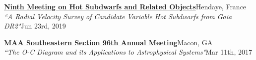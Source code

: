 \documentclass[letterpaper,12pt]{article}
\begin{document}
\vspace{3mm}
\noindent{}

\begin{etaremune}
    \item \href{https://sdob9.sciencesconf.org/}{{\small\textbf{Ninth Meeting on Hot Subdwarfs and Related Objects}}}\hfill{\small Hendaye, France}\\
    {\footnotesize \textit{``A Radial Velocity Survey of Candidate Variable Hot Subdwarfs from Gaia DR2"}\hfill \footnotesize Jun 23rd, 2019}
    \item \href{http://sections.maa.org/southeastern/2017Conference/}{{\small\textbf{MAA Southeastern Section 96th Annual Meeting}}}\hfill{\small Macon, GA}\\
    {\footnotesize \textit{``The O-C Diagram and its Applications to Astrophysical Systems"}\hfill \footnotesize Mar 11th, 2017}
\end{etaremune}

\vspace{3mm}
\noindent{}
\end{document}
